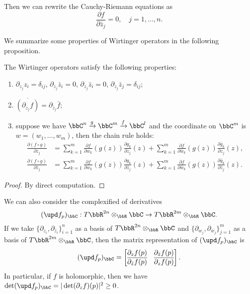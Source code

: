     Then we can rewrite the Cauchy-Riemann equations as
    \[ \frac{\partial f}{\partial \bar{z}_j} = 0, \quad j = 1, \ldots, n. \]

    We summarize some properties of Wirtinger operators in the following proposition.
    \begin{proposition}\label{prop:properties_of_Wirtinger_operators}
        The Wirtinger operators satisfy the following properties:
        \begin{enumerate}
            \item \(\partial_{z_j} z_i = \delta_{ij}\), \(\partial_{z_j} \bar{z}_i = 0\), \(\partial_{z_j} \bar{z}_i = 0\), \(\partial_{z_j} \bar{z}_j = \delta_{ij}\);
            \item \(\overline{\left( \partial_{z_j} f \right)} = \partial_{\bar{z}_j} \bar{f}\);
            \item suppose we have \(\bbC^n \xrightarrow{g} \bbC^m \xrightarrow{f} \bbC^l\) and the coordinate on \(\bbC^m\) is \(w = (w_1, \ldots, w_m)\), then the chain rule holds:
                \begin{align*}
                    \frac{\partial (f \circ g)}{\partial z_j} &= \sum_{k=1}^m \frac{\partial f}{\partial w_k}(g(z)) \frac{\partial g_k}{\partial z_j}(z) + \sum_{k=1}^m \frac{\partial f}{\partial \bar{w}_k}(g(z)) \frac{\partial \bar{g}_k}{\partial z_j}(z), \\
                    \frac{\partial (f \circ g)}{\partial \bar{z}_j} &= \sum_{k=1}^m \frac{\partial f}{\partial w_k}(g(z)) \frac{\partial g_k}{\partial \bar{z}_j}(z) + \sum_{k=1}^m \frac{\partial f}{\partial \bar{w}_k}(g(z)) \frac{\partial \bar{g}_k}{\partial \bar{z}_j}(z).
                \end{align*}
        \end{enumerate}
    \end{proposition}
    \begin{proof}
        By direct computation.
    \end{proof}

    We can also consider the complexified of derivatives
    \[ (\upd f_p)_\bbC: T\bbR^{2n} \otimes_\bbR \bbC \to T\bbR^{2m} \otimes_\bbR \bbC. \]
    If we take \(\{\partial_{z_i}, \partial_{\bar{z}_i}\}_{i=1}^n\) as a basis of \(T\bbR^{2n} \otimes_\bbR \bbC\) and \(\{\partial_{w_j}, \partial_{\bar{w}_j}\}_{j=1}^m\) as a basis of \(T\bbR^{2m} \otimes_\bbR \bbC\),
    then the matrix representation of \((\upd f_p)_\bbC\) is
    \[ (\upd f_p)_\bbC = \begin{bmatrix}
        \partial_z f(p) & \partial_{\bar{z}} f(p) \\
        \overline{\partial_{\bar{z}} f(p)} & \overline{\partial_z f(p)}
    \end{bmatrix}. \]
    In particular, if \(f\) is holomorphic, then we have \(\det (\upd f_p)_\bbC = |\det(\partial_z f)(p)|^2 \geq 0\).

